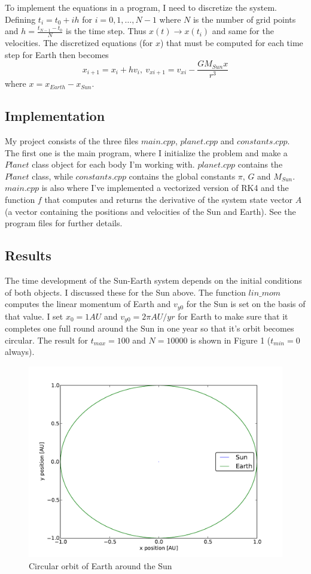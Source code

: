 \documentclass[a4paper,12pt, english]{article}
\begin{document}
To implement the equations in a program, I need to discretize the system. Defining $t_i = t_0 + ih$ for $i = 0, 1, \dots , N-1$ where $N$ is the number of grid points and 
$h = \frac{t_{N-1} - t_0}{N}$ is the time step. Thus $x(t) \rightarrow x(t_i)$ and same for the velocities. The discretized equations (for $x$) that must be computed for each time step for Earth then becomes
\[
x_{i+1} = x_i + hv_i, \ v_{xi+1} = v_{xi} - \frac{GM_{Sun}x}{r^3}
\]
where $x = x_{Earth} - x_{Sun}$. 

\subsection*{Implementation}
My project consists of the three files $main.cpp$, $planet.cpp$ and $constants.cpp$. The first one is the main program, where I initialize the problem and make a $Planet$ class object for each body I'm working with. $planet.cpp$ contains the $Planet$ class, while $constants.cpp$ contains the global constants $\pi$, $G$ and $M_{Sun}$. $main.cpp$ is also where I've implemented a vectorized version of RK4 and the function $f$ that computes and returns the derivative of the system state vector $A$ (a vector containing the positions and velocities of the Sun and Earth). See the program files for further details.

\subsection*{Results}
The time development of the Sun-Earth system depends on the initial conditions of both objects. I discussed these for the Sun above. The function $lin\_mom$ computes the linear momentum of Earth and $v_{y0}$ for the Sun is set on the basis of that value. I set $x_0 = 1 AU$ and 
$v_{y0} = 2\pi AU/yr$ for Earth to make sure that it completes one full round around the Sun in one year so that it's orbit becomes circular. The result for $t_{max} = 100$ and $N = 10000$ is shown in Figure 1 ($t_{min} = 0$ always).

\begin{figure}[!h]
\centering
\includegraphics[scale = 0.5]{Fig1.pdf}
\caption{Circular orbit of Earth around the Sun}
\end{figure} 
\end{document}
